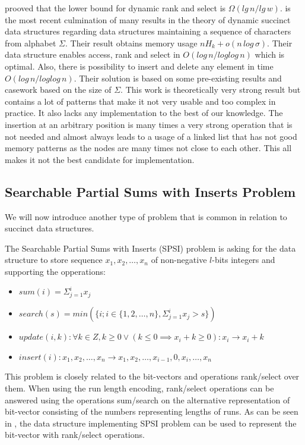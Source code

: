 \cite{beame2002optimal} prooved that the lower bound for dynamic rank and select is $\Omega(lg\,n/lg\,w)$. \cite{munro2015compressed} is the most recent culmination of many results in the theory of dynamic succinct data structures regarding data structures maintaining a sequence of characters from alphabet $\Sigma$. Their result obtains memory usage $nH_k+o(n\,log\,\sigma)$. Their data structure enables access, rank and select in $O(log\,n/log log\,n)$ which is optimal. Also, there is possibility to insert and delete any element in time $O(log\,n/log log\,n)$. Their solution is based on some pre-existing results and casework based on the size of $\Sigma$. This work is theoretically very strong result but contains a lot of patterns that make it not very usable and too complex in practice. It also lacks any implementation to the best of our knowledge. The insertion at an arbitrary position is many times a very strong operation that is not needed and almost always leads to a usage of a linked list that has not good memory patterns as the nodes are many times not close to each other. This all makes it not the best candidate for implementation.

\subsection{Searchable Partial Sums with Inserts Problem}

We will now introduce another type of problem that is common in relation to succinct data structures.

\begin{definition}
The Searchable Partial Sums with Inserts (SPSI) problem is asking for the data structure to
store sequence $x_1, x_2, \ldots , x_n$ of non-negative $l$-bits integers and supporting the opperations:
\begin{itemize}
    \item $sum(i) = \Sigma_{j=1}^{i} x_j$
    \item $search(s) = min(\{i; i\in \{1, 2,\ldots, n\}, \Sigma_{j=1}^{i} x_j > s \})$
    \item $update(i, k): \forall k \in Z, k \geq 0 \lor (k\leq 0 \implies x_i + k \geq 0): x_i \rightarrow x_i + k$
    \item $insert(i): x_1, x_2,\ldots, x_n \rightarrow x_1, x_2,\ldots , x_{i-1}, 0, x_{i}, \ldots , x_n$
\end{itemize}
\end{definition}

This problem is closely related to the bit-vectors and operations rank/select over them. When using the run length encoding, rank/select operations can be answered using the operations sum/search on the alternative representation of bit-vector consisting of the numbers representing lengths of runs. As can be seen in \cite{prezza2017framework}, the data structure implementing SPSI problem can be used to represent the bit-vector with rank/select operations.

